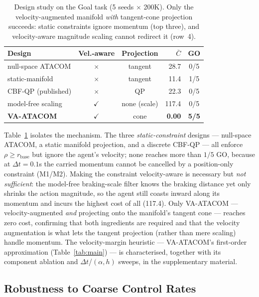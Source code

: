 \documentclass[letterpaper]{article}
\begin{document}
\begin{table}[t]
\centering
\caption{Design study on the Goal task (5 seeds $\times$ 200K). Only the velocity-augmented manifold \emph{with} tangent-cone projection succeeds: static constraints ignore momentum (top three), and velocity-aware magnitude scaling cannot redirect it (row~4).}
\label{tab:design}
\setlength{\tabcolsep}{3pt}
\small
\begin{tabular}{lccrc}
\toprule
Design & Vel.-aware & Projection & $\bar C$ & GO \\
\midrule
null-space ATACOM   & $\times$     & tangent      & 28.7  & 0/5 \\
static-manifold     & $\times$     & tangent      & 11.4  & 1/5 \\
CBF-QP (published)  & $\times$     & QP           & 22.3  & 0/5 \\
model-free scaling  & $\checkmark$ & none (scale) & 117.4 & 0/5 \\
\textbf{VA-ATACOM}  & $\checkmark$ & cone         & \textbf{0.00} & \textbf{5/5} \\
\bottomrule
\end{tabular}
\end{table}

Table~\ref{tab:design} isolates the mechanism. The three \emph{static-constraint} designs --- null-space ATACOM, a static manifold projection, and a discrete CBF-QP --- all enforce $\rho \ge r_\text{base}$ but ignore the agent's velocity; none reaches more than $1/5$ GO, because at $\Delta t{=}0.1$s the carried momentum cannot be cancelled by a position-only constraint (M1/M2). Making the constraint velocity-aware is necessary but \emph{not sufficient}: the model-free braking-scale filter knows the braking distance yet only shrinks the action magnitude, so the agent still coasts inward along its momentum and incurs the highest cost of all (117.4). Only VA-ATACOM --- velocity-augmented \emph{and} projecting onto the manifold's tangent cone --- reaches zero cost, confirming that both ingredients are required and that the velocity augmentation is what lets the tangent projection (rather than mere scaling) handle momentum. The velocity-margin heuristic --- VA-ATACOM's first-order approximation (Table~\ref{tab:main}) --- is characterised, together with its component ablation and $\Delta t$/$(\alpha,h)$ sweeps, in the supplementary material.

\subsection{Robustness to Coarse Control Rates}
\label{sec:coarse}
\end{document}
